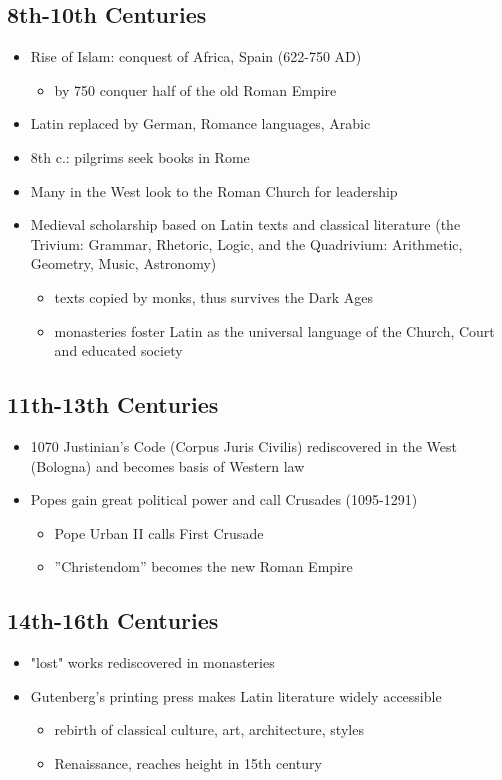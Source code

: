 \documentclass[12pt, twoside]{article}
\begin{document}
\subsection{8th-10th Centuries}
\begin{itemize}
\item Rise of Islam: conquest of Africa, Spain (622-750 AD)
	\begin{itemize}
	\item by 750 conquer half of the old Roman Empire 
	\end{itemize}
\item Latin replaced by German, Romance languages, Arabic
\item 8th c.: pilgrims seek books in Rome
\item Many in the West look to the Roman Church for leadership
\item Medieval scholarship based on Latin texts and classical literature (the Trivium: Grammar, Rhetoric, Logic, and the Quadrivium: Arithmetic, Geometry, Music, Astronomy) 
	\begin{itemize}
	\item texts copied by monks, thus survives the Dark Ages
	\item monasteries foster Latin as the universal language of the Church, Court and educated society
	\end{itemize}
\end{itemize}

\subsection{11th-13th Centuries}
\begin{itemize}
\item 1070 Justinian’s Code (Corpus Juris Civilis) rediscovered in the West (Bologna) and becomes basis of Western law
\item Popes gain great political power and call  Crusades (1095-1291)
	\begin{itemize}
	\item Pope Urban II calls First Crusade
	\item ”Christendom” becomes the new Roman Empire
	\end{itemize}
\end{itemize}

\subsection{14th-16th Centuries}
\begin{itemize}
\item "lost" works rediscovered in monasteries
\item Gutenberg’s printing press makes Latin literature widely accessible
	\begin{itemize}
	\item rebirth of classical culture, art, architecture, styles
	\item Renaissance, reaches height in 15th century
	\end{itemize}
\end{itemize}
\end{document}
